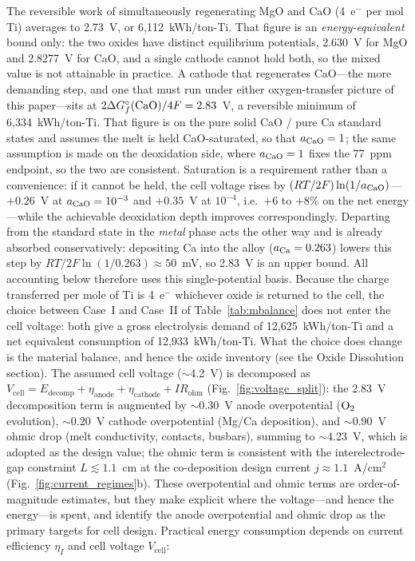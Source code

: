 \documentclass[pdflatex,sn-basic,Numbered]{sn-jnl}
\begin{document}
The reversible work of simultaneously regenerating MgO and CaO (4~e$^-$ per mol Ti) averages to 2.73~V, or 6{,}112~kWh/ton-Ti. That figure is an \emph{energy-equivalent} bound only: the two oxides have distinct equilibrium potentials, 2.630~V for MgO and 2.8277~V for CaO, and a single cathode cannot hold both, so the mixed value is not attainable in practice. A cathode that regenerates CaO---the more demanding step, and one that must run under either oxygen-transfer picture of this paper---sits at $2\Delta G^{\circ}_{f}(\ce{CaO})/4F = 2.83$~V, a reversible minimum of 6{,}334~kWh/ton-Ti. That figure is on the pure solid CaO / pure Ca standard states and assumes the melt is held CaO-saturated, so that $a_{\ce{CaO}} = 1$; the same assumption is made on the deoxidation side, where $a_{\ce{CaO}} = 1$ fixes the 77~ppm endpoint, so the two are consistent. Saturation is a requirement rather than a convenience: if it cannot be held, the cell voltage rises by $(RT/2F)\ln(1/a_{\ce{CaO}})$---$+0.26$~V at $a_{\ce{CaO}} = 10^{-3}$ and $+0.35$~V at $10^{-4}$, i.e.\ $+6$ to $+8$\% on the net energy---while the achievable deoxidation depth improves correspondingly. Departing from the standard state in the \emph{metal} phase acts the other way and is already absorbed conservatively: depositing Ca into the alloy ($a_{\ce{Ca}} = 0.263$) lowers this step by $RT/2F\ln(1/0.263) \approx 50$~mV, so 2.83~V is an upper bound. All accounting below therefore uses this single-potential basis. Because the charge transferred per mole of Ti is 4~e$^-$ whichever oxide is returned to the cell, the choice between Case~I and Case~II of Table~\ref{tab:mbalance} does not enter the cell voltage: both give a gross electrolysis demand of 12{,}625~kWh/ton-Ti and a net equivalent consumption of 12{,}933~kWh/ton-Ti. What the choice does change is the material balance, and hence the oxide inventory (see the Oxide Dissolution section). The assumed cell voltage ($\sim$4.2~V) is decomposed as $V_{\mathrm{cell}} = E_{\mathrm{decomp}} + \eta_{\mathrm{anode}} + \eta_{\mathrm{cathode}} + IR_{\mathrm{ohm}}$ (Fig.~\ref{fig:voltage_split}): the 2.83~V decomposition term is augmented by $\sim$0.30~V anode overpotential ($\ce{O2}$ evolution), $\sim$0.20~V cathode overpotential (Mg/Ca deposition), and $\sim$0.90~V ohmic drop (melt conductivity, contacts, busbars), summing to $\sim$4.23~V, which is adopted as the design value; the ohmic term is consistent with the interelectrode-gap constraint $L \lesssim 1.1$~cm at the co-deposition design current $j \approx 1.1$~A/cm$^2$ (Fig.~\ref{fig:current_regimes}b). These overpotential and ohmic terms are order-of-magnitude estimates, but they make explicit where the voltage---and hence the energy---is spent, and identify the anode overpotential and ohmic drop as the primary targets for cell design. Practical energy consumption depends on current efficiency $\eta_I$ and cell voltage $V_{\mathrm{cell}}$:
\end{document}
